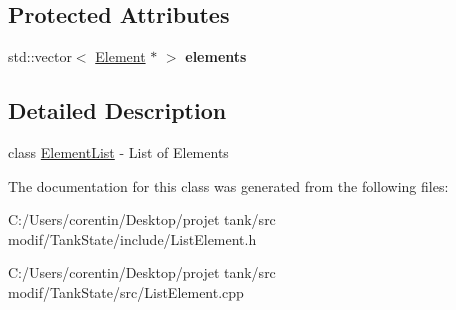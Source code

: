 \subsection*{Protected Attributes}
\begin{DoxyCompactItemize}
\item 
\mbox{\label{classstate_1_1_list_element_ad7d70434d4cd8450466d6e4a094b1ac3}} 
std\+::vector$<$ \hyperlink{classstate_1_1_element}{Element} $\ast$ $>$ {\bfseries elements}
\end{DoxyCompactItemize}


\subsection{Detailed Description}
class \hyperlink{classstate_1_1_element_list}{Element\+List} -\/ List of Elements 

The documentation for this class was generated from the following files\+:\begin{DoxyCompactItemize}
\item 
C\+:/\+Users/corentin/\+Desktop/projet tank/src modif/\+Tank\+State/include/List\+Element.\+h\item 
C\+:/\+Users/corentin/\+Desktop/projet tank/src modif/\+Tank\+State/src/List\+Element.\+cpp\end{DoxyCompactItemize}
